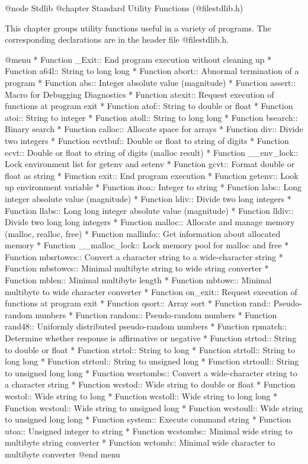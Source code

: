 @node Stdlib
@chapter Standard Utility Functions (@file{stdlib.h})

This chapter groups utility functions useful in a variety of programs.
The corresponding declarations are in the header file @file{stdlib.h}.

@menu 
* Function _Exit::       End program execution without cleaning up
* Function a64l::        String to long long
* Function abort::       Abnormal termination of a program
* Function abs::         Integer absolute value (magnitude)
* Function assert::      Macro for Debugging Diagnostics
* Function atexit::      Request execution of functions at program exit
* Function atof::        String to double or float
* Function atoi::        String to integer
* Function atoll::       String to long long
* Function bsearch::     Binary search
* Function calloc::      Allocate space for arrays
* Function div::         Divide two integers
* Function ecvtbuf::     Double or float to string of digits
* Function ecvt::        Double or float to string of digits (malloc result)
* Function __env_lock::  Lock environment list for getenv and setenv
* Function gcvt::        Format double or float as string
* Function exit::        End program execution
* Function getenv::      Look up environment variable
* Function itoa::        Integer to string
* Function labs::        Long integer absolute value (magnitude)
* Function ldiv::        Divide two long integers
* Function llabs::       Long long integer absolute value (magnitude)
* Function lldiv::       Divide two long long integers
* Function malloc::      Allocate and manage memory (malloc, realloc, free)
* Function mallinfo::    Get information about allocated memory
* Function __malloc_lock::	Lock memory pool for malloc and free
* Function mbsrtowcs::   Convert a character string to a wide-character string
* Function mbstowcs::    Minimal multibyte string to wide string converter
* Function mblen::       Minimal multibyte length
* Function mbtowc::      Minimal multibyte to wide character converter
* Function on_exit::     Request execution of functions at program exit
* Function qsort::       Array sort
* Function rand::        Pseudo-random numbers
* Function random::      Pseudo-random numbers
* Function rand48::      Uniformly distributed pseudo-random numbers
* Function rpmatch::     Determine whether response is affirmative or negative
* Function strtod::      String to double or float
* Function strtol::      String to long
* Function strtoll::     String to long long
* Function strtoul::     String to unsigned long
* Function strtoull::    String to unsigned long long
* Function wcsrtombs::   Convert a wide-character string to a character string
* Function wcstod::      Wide string to double or float
* Function wcstol::      Wide string to long
* Function wcstoll::     Wide string to long long
* Function wcstoul::     Wide string to unsigned long
* Function wcstoull::    Wide string to unsigned long long
* Function system::      Execute command string
* Function utoa::        Unsigned integer to string
* Function wcstombs::    Minimal wide string to multibyte string converter
* Function wctomb::      Minimal wide character to multibyte converter
@end menu

